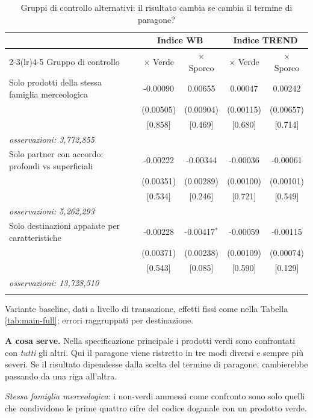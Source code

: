 \begin{table}[htbp]
\centering
\footnotesize
\caption{Gruppi di controllo alternativi: il risultato cambia se cambia il termine di paragone?}
\label{tab:stability}
\begin{threeparttable}
\begin{tabular}{lcccc}
\toprule
 & \multicolumn{2}{c}{Indice WB} & \multicolumn{2}{c}{Indice TREND} \\
\cmidrule(lr){2-3}\cmidrule(lr){4-5}
Gruppo di controllo & $\times$ Verde & $\times$ Sporco & $\times$ Verde & $\times$ Sporco \\
\midrule
Solo prodotti della stessa famiglia merceologica & -0.00090 & 0.00655 & 0.00047 & 0.00242 \\
 & (0.00505) & (0.00904) & (0.00115) & (0.00657) \\
 & [0.858] & [0.469] & [0.680] & [0.714] \\
\quad \textit{osservazioni: 3,772,855} & & & & \\
\addlinespace
Solo partner con accordo: profondi vs superficiali & -0.00222 & -0.00344 & -0.00036 & -0.00061 \\
 & (0.00351) & (0.00289) & (0.00100) & (0.00101) \\
 & [0.534] & [0.246] & [0.721] & [0.549] \\
\quad \textit{osservazioni: 5,262,293} & & & & \\
\addlinespace
Solo destinazioni appaiate per caratteristiche & -0.00228 & -0.00417$^{*}$ & -0.00059 & -0.00115 \\
 & (0.00371) & (0.00238) & (0.00109) & (0.00074) \\
 & [0.543] & [0.085] & [0.590] & [0.129] \\
\quad \textit{osservazioni: 13,728,510} & & & & \\
\addlinespace
\bottomrule
\end{tabular}
\begin{tablenotes}[flushleft]\footnotesize
\item Variante baseline, dati a livello di transazione, effetti fissi come nella Tabella \ref{tab:main-full}; errori raggruppati per destinazione.
\item \textbf{A cosa serve.} Nella specificazione principale i prodotti verdi sono confrontati con \emph{tutti} gli altri. Qui il paragone viene ristretto in tre modi diversi e sempre pi\`u severi. Se il risultato dipendesse dalla scelta del termine di paragone, cambierebbe passando da una riga all'altra.
\item \textit{Stessa famiglia merceologica}: i non-verdi ammessi come confronto sono solo quelli che condividono le prime quattro cifre del codice doganale con un prodotto verde.

\end{tablenotes}
\end{threeparttable}
\end{table}

